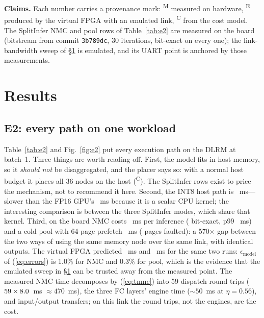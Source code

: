 \documentclass[lettersize,journal]{IEEEtran}
\newcommand{\M}{\textsuperscript{M}}
\newcommand{\E}{\textsuperscript{E}}
\newcommand{\Cm}{\textsuperscript{C}}
\begin{document}
\textbf{Claims.} Each number carries a provenance mark: \M{} measured on hardware, \E{} produced by the virtual FPGA with an emulated link, \Cm{} from the cost model. The SplitInfer NMC and pool rows of Table~\ref{tab:e2} are measured on the board (bitstream from commit \texttt{3b789dc}, 30 iterations, bit-exact on every one); the link-bandwidth sweep of \S\ref{sec:results} is emulated, and its UART point is anchored by those measurements.

\section{Results}
\label{sec:results}

\subsection{E2: every path on one workload}
Table~\ref{tab:e2} and Fig.~\ref{fig:e2} put every execution path on the DLRM at batch~1. Three things are worth reading off. First, the model fits in host memory, so it \emph{should not} be disaggregated, and the placer says so: with a normal host budget it places all 36 nodes on the host (\Cm). The SplitInfer rows exist to price the mechanism, not to recommend it here. Second, the INT8 host path is \MEmulSIhostMedian~ms---slower than the FP16 GPU's \MEmulBthreetrtfponesixgpuMedian~ms because it is a scalar CPU kernel; the interesting comparison is between the three SplitInfer modes, which share that kernel. Third, on the board NMC costs \MUsbSInmcMedian~ms per inference (\MUsbSInmcBitExact{} bit-exact, p99 \MUsbSInmcPninenine~ms) and a cold pool with 64-page prefetch \MUsbSIpoolcoldMedian~ms (\MUsbSIpoolcoldPages{} pages faulted): a 570$\times$ gap between the two ways of using the same memory node over the same link, with identical outputs. The virtual FPGA predicted \EEmulSInmcMedian~ms and \EEmulSIpoolMedian~ms for the same two runs: $\epsilon_{\text{model}}$ of (\ref{eq:errors}) is 1.0\% for NMC and 0.3\% for pool, which is the evidence that the emulated sweep in \S\ref{sec:results} can be trusted away from the measured point. The measured NMC time decomposes by (\ref{eq:tnmc}) into 59 dispatch round trips ($59 \times 8.0$~ms $\approx 470$~ms), the three FC layers' engine time (${\sim}50$~ms at $\eta = 0.56$), and input/output transfers; on this link the round trips, not the engines, are the cost.
\end{document}
